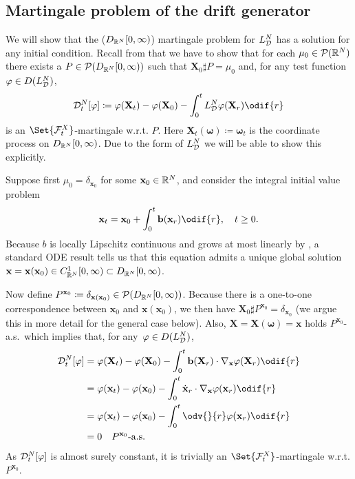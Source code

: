 \subsection{Martingale problem of the drift generator}

We will show that the (\(D_{\mathbb{R}^N}[0,\infty)\)) martingale problem for \(L_{\mathcal{D}}^N\) has a solution for any initial condition.
Recall from  that we have to show that for each \(\mu_0 \in \mathcal{P}(\mathbb{R}^N)\) there exists a \(P \in \mathcal{P}(D_{\mathbb{R}^N}[0,\infty))\) such that \( \bm{X}_0 \sharp P = \mu_0 \) and, for any test function \(\varphi \in D(L_{\mathcal{D}}^N)\),
\begin{equation}
  \cD_t^{N}[\varphi]
  \coloneqq \varphi(\bm{X}_t) - \varphi(\bm{X}_0) - \int_0^t L_{\cD}^{N} \varphi(\bm{X}_r) \odif{r}
\end{equation}
is an \(\Set{\cF_t^X}\)-martingale w.r.t. \( P \).
Here \(\bm{X}_t(\bm{\omega}) \coloneqq \bm{\omega}_t\) is the coordinate process on \(D_{\mathbb{R}^N}[0,\infty)\).
Due to the form of \(L_{\mathcal{D}}^N\) we will be able to show this explicitly.

Suppose first \(\mu_0 = \delta_{\bm{x}_0}\) for some \(\mathbf{x}_0 \in \mathbb{R}^N\), and consider the integral initial value problem
\begin{equation}\label{eq:int-IVP}
  \bm{x}_t = \bm{x}_0 + \int_0^t \bm{b}(\bm{x}_r) \odif{r}, \quad t \geq 0.
\end{equation}
Because \(b\) is locally Lipschitz continuous and grows at most linearly by , a standard ODE result tells us that this equation admits a unique global solution \(\mathbf{x} = \mathbf{x}(\mathbf{x}_0) \in C^1_{\mathbb{R}^N}[0,\infty) \subset D_{\mathbb{R}^N}[0,\infty)\).

Now define \(P^{\mathbf{x}_0} \coloneqq \delta_{\mathbf{x}(\mathbf{x}_0)} \in \mathcal{P}(D_{\mathbb{R}^N}[0,\infty))\).
Because there is a one-to-one correspondence between \( \bm{x}_0 \) and \( \bm{x}(\bm{x}_0) \), we then have \( \bm{X}_0 \sharp P^{\bm{x}_0} = \delta_{\bm{x}_0} \) (we argue this in more detail for the general case below).
Also, \(\bm{X} = \bm{X}(\bm{\omega}) = \bm{x}\) holds \(P^{\bm{x}_0}\)-a.s.\ which implies that, for any~\(\varphi \in D(L_{\mathcal{D}}^N)\),
\begin{equation}\label{eq:D=0-a.s.}
  \begin{split}
    \cD_t^{N}[\varphi] & = \varphi(\bm{X}_t) - \varphi(\bm{X}_0) - \int_0^t \bm{b}(\bm{X}_r) \cdot \nabla_{\bm{x}} \varphi(\bm{X}_r) \odif{r} \\
                       & = \varphi(\bm{x}_t) - \varphi(\bm{x}_0) - \int_0^t \dot{\bm{x}}_r \cdot \nabla_{\bm{x}} \varphi(\bm{x}_r) \odif{r}   \\
                       & = \varphi(\bm{x}_t) - \varphi(\bm{x}_0) - \int_0^t \odv{}{r} \varphi(\bm{x}_r) \odif{r}                              \\
                       & = 0 \quad P^{\bm{x}_0}\text{-a.s.}
  \end{split}
\end{equation}
As \(\mathcal{D}_t^{N}[\varphi]\) is almost surely constant, it is trivially an \(\Set{\cF_t^X}\)-martingale w.r.t. \( P^{\bm{x}_0} \).

